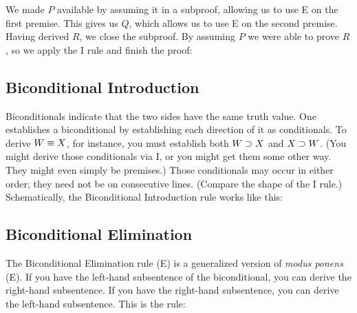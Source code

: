 \begin{ndproof}
	\open
		 
	\close
\end{ndproof}

We made $P$ available by assuming it in a subproof, allowing us to use {\eif}E on the first premise. This gives us $Q$, which allows us to use {\eif}E on the second premise. Having derived $R$, we close the subproof. By assuming $P$ we were able to prove $R$, so we apply the {\eif}I rule and finish the proof:
\label{HSproof}
\begin{ndproof}
	\open
	\close
\end{ndproof}




\subsection{Biconditional Introduction}
Biconditionals indicate that the two sides have the same truth value. One establishes a biconditional by establishing each direction of it as conditionals. To derive $W \equiv X$, for instance, you must establish both $W \supset X$ and $X \supset W$. (You might derive those conditionals via {\eif}I, or you might get them some other way. They might even simply be premises.) Those conditionals may occur in either order; they need not be on consecutive lines. (Compare the shape of the {\eand}I rule.) Schematically, the Biconditional Introduction rule works like this:

\begin{ndproof}
	 
\end{ndproof}


\subsection{Biconditional Elimination}

The Biconditional Elimination rule ({\eiff}E) is a generalized version of \emph{modus ponens} ({\eif}E). If you have the left-hand subsentence of the biconditional, you can derive the right-hand subsentence. If you have the right-hand subsentence, you can derive the left-hand subsentence. This is the rule:




